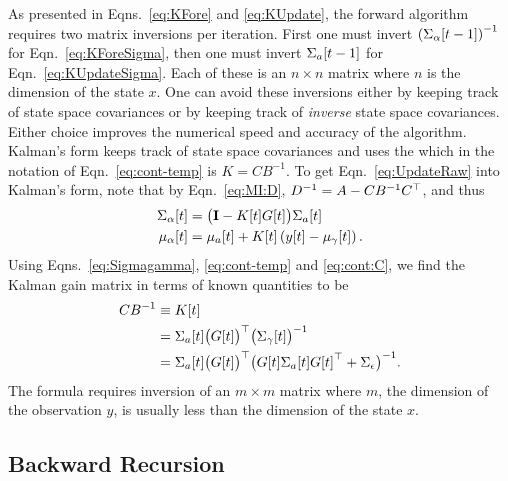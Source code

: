 As presented in Eqns.~\eqref{eq:KFore} and \eqref{eq:KUpdate}, the
forward algorithm requires two matrix inversions per iteration.  First
one must invert $\left( {\Sigma_\alpha}{[t-1]}\right)^{-1}$ for
Eqn.~\eqref{eq:KForeSigma}, then one must invert ${\Sigma_a}{[t-1]}$
for Eqn.~\eqref{eq:KUpdateSigma}.  Each of these is an $n\times n$
matrix where $n$ is the dimension of the state $x$.  One can avoid
these inversions either by keeping track of state space covariances or
by keeping track of \emph{inverse} state space covariances.  Either
choice improves the numerical speed and accuracy of the algorithm.
Kalman's form keeps track of state space covariances and uses the
\emph{} %
%
which in the notation of
Eqn.~\eqref{eq:cont-temp} is $K=CB^{-1}$.  To get
Eqn.~\eqref{eq:UpdateRaw} into Kalman's form, note that by
Eqn.~\eqref{eq:MI:D}, $D^{-1} = A -CB^{-1} C^\top$, and thus
\begin{subequations}
  \label{eq:KalmanGain}
  \begin{align}
    {\Sigma_\alpha}{[t]} &= \big({\bf I} - {K}{[t]} {G}{[t]}
    \big) {\Sigma_a}{[t]} \\
    {\mu_\alpha}{[t]} &= {\mu_a}{[t]} + {K}{[t]} \left(
      {y}{[t]} - {\mu_\gamma}{[t]}\right).
  \end{align}
\end{subequations}
Using Eqns.~\eqref{eq:Sigmagamma}, \eqref{eq:cont-temp} and
\eqref{eq:cont:C}, we find the Kalman gain matrix in terms of known
quantities to be
\begin{align*}
  CB^{-1} &\equiv {K}{[t]}\\
  &= {\Sigma_{a}}{[t]} \big({G}{[t]} \big)^\top \big(
  {\Sigma_\gamma}{[t]}\big)^{-1}\\
  &= {\Sigma_{a}}{[t]} \big({G}{[t]} \big)^\top \big({G}{[t]}{\Sigma_a}{[t]}{G}{[t]}^\top +
    \Sigma_\epsilon \big)^{-1}.
\end{align*}
The formula requires inversion of an $m\times m$ matrix where $m$, the
dimension of the observation $y$, is usually less than the dimension of
the state $x$.

\subsection{Backward Recursion}
\label{sec:DetailBack}

